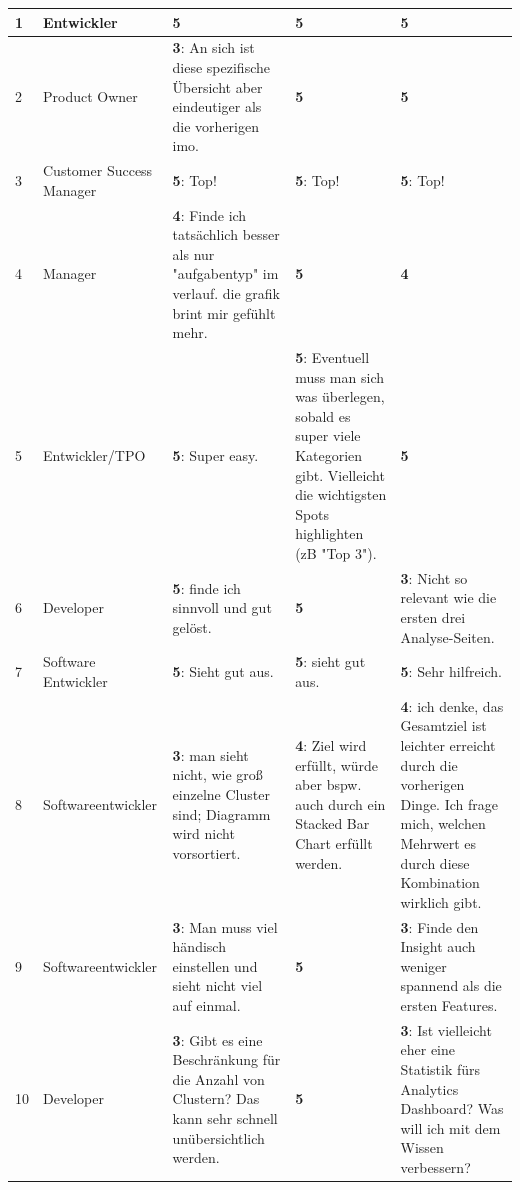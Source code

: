 \documentclass[
	english,
	ruledheaders=section,%
	class=report,%
	thesis={type=bachelor},%
	accentcolor=1b,%
	custommargins=true,%
	marginpar=false,%
	parskip=half-,%
	fontsize=11pt,%
	DIV=14,
]{tudapub}
\begin{document}
\begin{longtable}{l >{\RaggedRight}p{3cm} >{\RaggedRight}p{3.5cm} >{\RaggedRight}p{3.5cm} >{\RaggedRight}p{3.5cm}}
    1 & Entwickler & \textbf{5} & \textbf{5} & \textbf{5} \\
    \midrule
    2 & Product Owner & \textbf{3}: An sich ist diese spezifische Übersicht aber eindeutiger als die vorherigen imo. & \textbf{5} & \textbf{5} \\
    \midrule
    3 & Customer Success Manager & \textbf{5}: Top! & \textbf{5}: Top! & \textbf{5}: Top! \\
    \midrule
    4 & Manager & \textbf{4}: Finde ich tatsächlich besser als nur "aufgabentyp" im verlauf. die grafik brint mir gefühlt mehr. & \textbf{5} & \textbf{4} \\
    \midrule
    5 & Entwickler/TPO & \textbf{5}: Super easy. & \textbf{5}: Eventuell muss man sich was überlegen, sobald es super viele Kategorien gibt. Vielleicht die wichtigsten Spots highlighten (zB "Top 3"). & \textbf{5} \\
    \midrule
    6 & Developer & \textbf{5}: finde ich sinnvoll und gut gelöst. & \textbf{5} & \textbf{3}: Nicht so relevant wie die ersten drei Analyse-Seiten. \\
    \midrule
    7 & Software Entwickler & \textbf{5}: Sieht gut aus. & \textbf{5}: sieht gut aus. & \textbf{5}: Sehr hilfreich. \\
    \midrule
    8 & Softwareentwickler & \textbf{3}: man sieht nicht, wie groß einzelne Cluster sind; Diagramm wird nicht vorsortiert. & \textbf{4}: Ziel wird erfüllt, würde aber bspw. auch durch ein Stacked Bar Chart erfüllt werden. & \textbf{4}: ich denke, das Gesamtziel ist leichter erreicht durch die vorherigen Dinge. Ich frage mich, welchen Mehrwert es durch diese Kombination wirklich gibt. \\
    \midrule
    9 & Softwareentwickler & \textbf{3}: Man muss viel händisch einstellen und sieht nicht viel auf einmal. & \textbf{5} & \textbf{3}: Finde den Insight auch weniger spannend als die ersten Features. \\
    \midrule
    10 & Developer & \textbf{3}: Gibt es eine Beschränkung für die Anzahl von Clustern? Das kann sehr schnell unübersichtlich werden. & \textbf{5} & \textbf{3}: Ist vielleicht eher eine Statistik fürs Analytics Dashboard? Was will ich mit dem Wissen verbessern? \\
\end{longtable}

\clearpage
\end{document}
